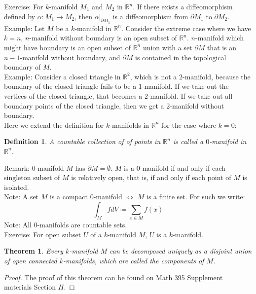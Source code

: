\documentclass[15pt]{book}
\theoremstyle{break}
\theoremstyle{break}
\newtheorem{thm}{Theorem}[section]
\newtheorem{defn}{Definition}[corL]
\newcommand{\R}{\mathbb{R}}
\newcommand{\note}{\color{red}Note: \color{black}}
\newcommand{\remark}{\color{blue}Remark: \color{black}}
\newcommand{\example}{\color{green}Example: \color{black}}
\newcommand{\exercise}{\color{green}Exercise: \color{black}}
\begin{document}
\exercise For $k$-manifold $M_1$ and $M_2$ in $\R^n$. If there exists a diffeomorphism defined by $\alpha:M_1 \to M_2$, then $\alpha|_{\partial M_1}$ is a diffeomorphism from $\partial M_1$ to $\partial M_2$.\\

\example Let $M$ be a $k$-manifold in $\R^n$. Consider the extreme case where we have $k=n$, $n$-manifold without boundary is an open subset of $\R^n$. $n$-manifold which might have boundary is an open subset of $\R^n$ union with a set $\partial M$ that is an $n-1$-manifold without boundary, and $\partial M$ is contained in the topological boundary of $M$. \\

\example
Consider a closed triangle in $\R^2$, which is not a $2$-manifold, because the boundary of the closed triangle fails to be a 1-manifold. If we take out the vertices of the closed triangle, that becomes a $2$-manifold. If we take out all boundary points of the closed triangle, then we get a 2-manifold without boundary.\\

\hfill\break
Here we extend the definition for $k$-manifolds in $\R^n$ for the case where $k=0$: \begin{defn} 
A countable collection of of points in $\R^n$ is called a $0$-manifold in $\R^n$.
\end{defn}

\remark $0$-manifold $M$ has $\partial M = \emptyset$. $M$ is a $0$-manifold if and only if each singleton subset of $M$ is relatively open, that is, if and only if each point of $M$ is isolated. \\

\note A set $M$ is a compact $0$-manifold $\iff$ $M$ is a finite set. For such we write: $$\int_M fdV \coloneqq \sum_{x \in M} f(x)$$
\note All $0$-manifolds are countable sets. \\

\exercise For open subset $U$ of a $k$-manifold $M$, $U$ is a $k$-manifold.\\

\begin{thm}
Every $k$-manifold $M$ can be decomposed uniquely as a disjoint union of open connected $k$-manifolds, which are called the components of $M$. 
\end{thm}
\begin{proof}
The proof of this theorem can be found on Math 395 Supplement materials Section $H$.
\end{proof}
\end{document}

